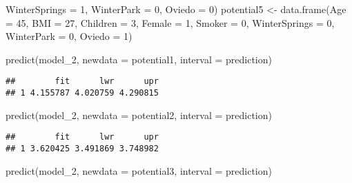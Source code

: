 \documentclass[
]{article}
\newenvironment{Shaded}{\begin{snugshade}}{\end{snugshade}}
\newcommand{\AttributeTok}[1]{\textcolor[rgb]{0.77,0.63,0.00}{#1}}
\newcommand{\DecValTok}[1]{\textcolor[rgb]{0.00,0.00,0.81}{#1}}
\newcommand{\FunctionTok}[1]{\textcolor[rgb]{0.00,0.00,0.00}{#1}}
\newcommand{\NormalTok}[1]{#1}
\newcommand{\OtherTok}[1]{\textcolor[rgb]{0.56,0.35,0.01}{#1}}
\newcommand{\StringTok}[1]{\textcolor[rgb]{0.31,0.60,0.02}{#1}}
\begin{document}
\begin{Shaded}
\begin{Highlighting}[]
                            \AttributeTok{WinterSprings =} \DecValTok{1}\NormalTok{,}
                            \AttributeTok{WinterPark =} \DecValTok{0}\NormalTok{,}
                            \AttributeTok{Oviedo =} \DecValTok{0}\NormalTok{)}
\NormalTok{potential5 }\OtherTok{\textless{}{-}} \FunctionTok{data.frame}\NormalTok{(}\AttributeTok{Age =} \DecValTok{45}\NormalTok{,}
                            \AttributeTok{BMI =} \DecValTok{27}\NormalTok{,}
                            \AttributeTok{Children =} \DecValTok{3}\NormalTok{,}
                            \AttributeTok{Female =} \DecValTok{1}\NormalTok{,}
                            \AttributeTok{Smoker =} \DecValTok{0}\NormalTok{,}
                            \AttributeTok{WinterSprings =} \DecValTok{0}\NormalTok{,}
                            \AttributeTok{WinterPark =} \DecValTok{0}\NormalTok{,}
                            \AttributeTok{Oviedo =} \DecValTok{1}\NormalTok{)}

\FunctionTok{predict}\NormalTok{(model\_2, }\AttributeTok{newdata =}\NormalTok{ potential1, }\AttributeTok{interval =} \StringTok{\textquotesingle{}prediction\textquotesingle{}}\NormalTok{)}
\end{Highlighting}
\end{Shaded}

\begin{verbatim}
##        fit      lwr      upr
## 1 4.155787 4.020759 4.290815
\end{verbatim}

\begin{Shaded}
\begin{Highlighting}[]
\FunctionTok{predict}\NormalTok{(model\_2, }\AttributeTok{newdata =}\NormalTok{ potential2, }\AttributeTok{interval =} \StringTok{\textquotesingle{}prediction\textquotesingle{}}\NormalTok{)}
\end{Highlighting}
\end{Shaded}

\begin{verbatim}
##        fit      lwr      upr
## 1 3.620425 3.491869 3.748982
\end{verbatim}

\begin{Shaded}
\begin{Highlighting}[]
\FunctionTok{predict}\NormalTok{(model\_2, }\AttributeTok{newdata =}\NormalTok{ potential3, }\AttributeTok{interval =} \StringTok{\textquotesingle{}prediction\textquotesingle{}}\NormalTok{)}
\end{Highlighting}
\end{Shaded}
\end{document}
